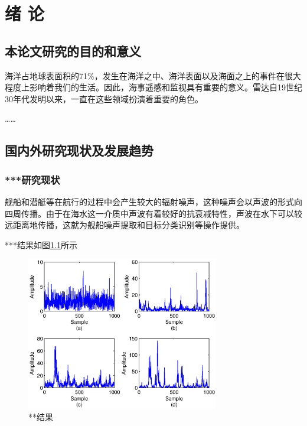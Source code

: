 \chapter{绪 论}
\label{chap:intro}
\section{本论文研究的目的和意义}


海洋占地球表面积的71\%，发生在海洋之中、海洋表面以及海面之上的事件在很大程度上影响着我们的生活。因此，海事遥感和监视具有重要的意义。雷达自19世纪30年代发明以来，一直在这些领域扮演着重要的角色。

……

\section{国内外研究现状及发展趋势}


\subsection{***研究现状}

舰船和潜艇等在航行的过程中会产生较大的辐射噪声，这种噪声会以声波的形式向四周传播。由于在海水这一介质中声波有着较好的抗衰减特性，声波在水下可以较远距离地传播，这就为舰船噪声提取和目标分类识别等操作提供\cite{Jiang2005Size}。

***结果如图\ref{fig:diagram}所示

\begin{figure}
 \centering
 \includegraphics[width=0.75\textwidth]{figures/Fig_1_1.eps}
 \caption{**结果}\label{fig:diagram}
\end{figure}


